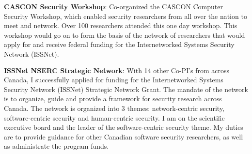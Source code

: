 \textbf{CASCON Security Workshop}: Co-organized the CASCON Computer Security Workshop, which enabled security researchers from all over the nation to meet and network.  Over 100 researchers attended this one day workshop.  This workshop would go on to form the basis of the network of researchers that would apply for and receive federal funding for the Internetworked Systems Security Network (ISSNet).  

\textbf{ISSNet NSERC Strategic Network}: With 14 other Co-PI's
from across Canada, I successfully applied for funding for the
Internetworked Systems Security Network (ISSNet) Strategic Network
Grant.  The mandate of the network is to organize, guide and provide a
framework for security research across Canada.  The network is
organized into 3 themes: network-centric security, software-centric
security and human-centric security.  I am on the scientific executive
board and the leader of the  software-centric security theme.  My duties are to provide
guidance for other Canadian software security researchers, as well as
administrate the program funds.

